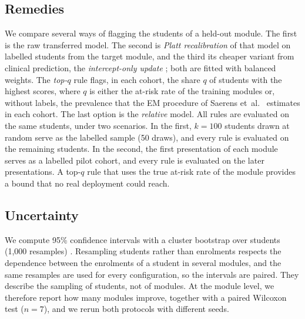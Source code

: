 \documentclass[journal]{IEEEtran}
\begin{document}
\subsection{Remedies}
We compare several ways of flagging the students of a held-out module. The first is the raw transferred model. The second is \emph{Platt recalibration} \cite{platt1999probabilistic} of that model on labelled students from the target module, and the third its cheaper variant from clinical prediction, the \emph{intercept-only update} \cite{janssen2008updating}; both are fitted with balanced weights. The \emph{top-$q$} rule flags, in each cohort, the share $q$ of students with the highest scores, where $q$ is either the at-risk rate of the training modules or, without labels, the prevalence that the EM procedure of Saerens et~al.\ \cite{saerens2002priors} estimates in each cohort. The last option is the \emph{relative} model. All rules are evaluated on the same students, under two scenarios. In the first, $k=100$ students drawn at random serve as the labelled sample (50 draws), and every rule is evaluated on the remaining students. In the second, the first presentation of each module serves as a labelled pilot cohort, and every rule is evaluated on the later presentations. A top-$q$ rule that uses the true at-risk rate of the module provides a bound that no real deployment could reach.

\subsection{Uncertainty}
We compute 95\% confidence intervals with a cluster bootstrap over students (1{,}000 resamples) \cite{efron1993bootstrap}. Resampling students rather than enrolments respects the dependence between the enrolments of a student in several modules, and the same resamples are used for every configuration, so the intervals are paired. They describe the sampling of students, not of modules. At the module level, we therefore report how many modules improve, together with a paired Wilcoxon test ($n=7$), and we rerun both protocols with \resNSeeds{} different seeds.
\end{document}
